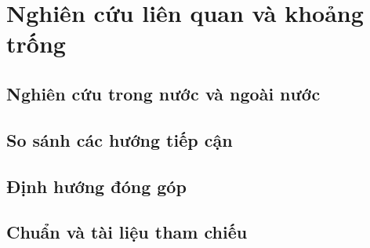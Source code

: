 \par{}
\section{Nghiên cứu liên quan và khoảng trống}\label{section:related-work-1}

\par{}
\subsection{Nghiên cứu trong nước và ngoài nước}\label{subsection:related-work-2}

\par{}
\subsection{So sánh các hướng tiếp cận}\label{subsection:related-work-3}

\par{}
\subsection{Định hướng đóng góp}\label{subsection:related-work-4}

\par{}
\subsection{Chuẩn và tài liệu tham chiếu}\label{subsection:related-work-5}

